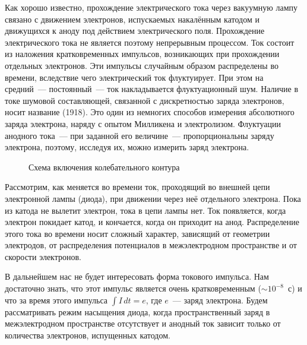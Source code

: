 


Как хорошо известно, прохождение электрического тока через вакуумную лампу связано с движением электронов, испускаемых
накалённым катодом и движущихся к аноду под действием электрического поля. Прохождение электрического тока не является
поэтому непрерывным процессом. Ток состоит из наложения кратковременных импульсов, возникающих при прохождении отдельных
электронов. Эти импульсы случайным образом распределены во времени, вследствие чего электрический ток флуктуирует. При
этом на средний~--- постоянный~--- ток накладывается флуктуационный шум. Наличие в токе шумовой составляющей, связанной
с дискретностью заряда электронов, носит название  (1918). Это один из немногих способов измерения
абсолютного заряда электрона, наряду с опытом Милликена и электролизом. Флуктуации анодного тока~--- при заданной его
величине~--- пропорциональны заряду электрона, поэтому, исследуя их, можно измерить заряд электрона.

\begin{figure}[h!]
	\caption{Схема включения колебательного контура}
\end{figure}

Рассмотрим, как меняется во времени ток, проходящий во внешней цепи электронной лампы (диода), при движении через неё
отдельного электрона. Пока из катода не вылетит электрон, тока в цепи лампы нет. Ток появляется, когда электрон покидает
катод, и кончается, когда он приходит на анод. Распределение этого тока во времени носит сложный характер, зависящий от
геометрии электродов, от распределения потенциалов в межэлектродном пространстве и от скорости электронов.

В дальнейшем нас не будет интересовать форма токового импульса. Нам достаточно знать, что этот импульс является очень
кратковременным (${\sim}10^{-8}$~с) и что за время этого импульса $\int I\,dt=e$, где $e$~--- заряд электрона. Будем
рассматривать режим насыщения диода, когда пространственный заряд в межэлектродном пространстве отсутствует и анодный
ток зависит только от количества электронов, испущенных катодом.


